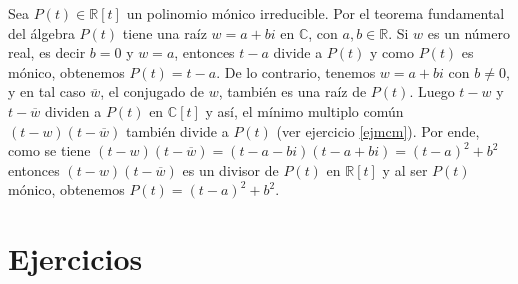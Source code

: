 \dem Sea $P(t)\in\mathbb{R}[t]$ un polinomio mónico irreducible. Por el teorema fundamental del álgebra $P(t)$ tiene una raíz $w=a+bi$ en $\mathbb{C}$, con $a,b\in\mathbb{R}$. Si $w$ es un número real, es decir $b=0$ y $w=a$, entonces $t-a$ divide a $P(t)$ y como $P(t)$ es mónico, obtenemos $P(t)=t-a$. De lo contrario, tenemos $w=a+bi$ con $b\ne 0$, y en tal caso $\overline{w}$, el conjugado de $w$, también es una raíz de $P(t)$. Luego $t-w$ y $t-\overline{w}$ dividen a $P(t)$ en $\mathbb{C}[t]$ y así, el mínimo multiplo común $(t-w)(t-\overline{w})$ también divide a $P(t)$ (ver ejercicio \ref{ejmcm}). Por ende, como se tiene $(t-w)(t-\overline{w})=(t-a-bi)(t-a+bi)=(t-a)^2+b^2$ entonces $(t-w)(t-\overline{w})$ es un divisor de $P(t)$ en $\mathbb{R}[t]$ y al ser $P(t)$ mónico, obtenemos $P(t)=(t-a)^2+b^2$.

\section*{Ejercicios}

